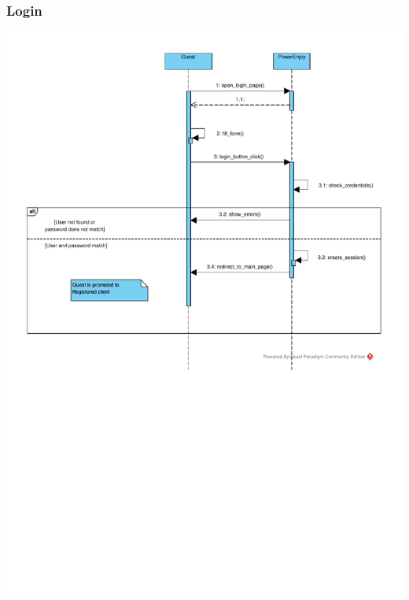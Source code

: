 \subsubsection{Login}
\includegraphics[width=\textwidth, keepaspectratio]{../images/diagram/sequence/login.pdf}


